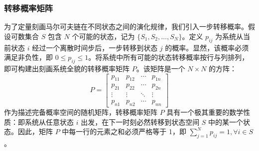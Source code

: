 \subsubsection{转移概率矩阵}
为了定量刻画马尔可夫链在不同状态之间的演化规律，我们引入一步转移概率。假设可数集合 $S$ 包含 $N$ 个可能的状态，记为 $\{S_1, S_2, \dots, S_N\}$。定义 $p_{ij}$ 为系统从当前状态 $i$ 经过一个离散时间步后，一步转移到状态 $j$ 的概率。显然，该概率必须满足非负性，即 $0 \le p_{ij} \le 1$。将系统中所有可能的状态转移概率按行与列排列，即可构建出刻画系统全貌的转移概率矩阵 $P$。该矩阵是一个 $N \times N$ 的方阵：
\begin{equation}
    P = \begin{bmatrix}
        p_{11} & p_{12} & \cdots & p_{1n} \\
        p_{21} & p_{22} & \cdots & p_{2n} \\
        \vdots & \vdots & \ddots & \vdots \\
        p_{n1} & p_{n2} & \cdots & p_{nn}
    \end{bmatrix}
\end{equation}
作为描述完备概率空间的随机矩阵，转移概率矩阵 $P$ 具有一个极其重要的数学性质：即系统从任意状态 $i$ 出发，在下一时刻必然转移到状态空间 $S$ 中的某一个状态。因此，矩阵 $P$ 中每一行的元素之和必须严格等于 1，即 $\sum_{j=1}^{N} p_{ij} = 1, \forall i \in S$。

